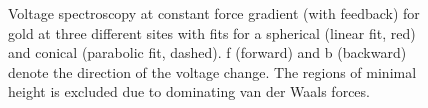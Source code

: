 \documentclass[a4paper]{scrartcl}
\numberwithin{equation}{section}
\numberwithin{figure}{section}
\numberwithin{table}{section}
\begin{document}
\begin{figure}[!h]
\hfill
{}
\caption{\small Voltage spectroscopy at constant force gradient (with feedback) for gold at three different sites with fits for a spherical (linear fit, red) and conical (parabolic fit, dashed). f (forward) and b (backward) denote the direction of the voltage change. The regions of minimal height is excluded due to dominating van der Waals forces.}
\label{fig:tipgold}
\end{figure}
\end{document}
